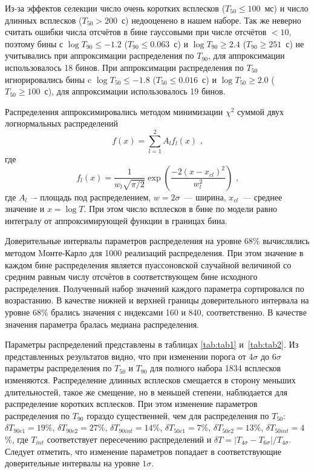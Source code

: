 Из-за эффектов селекции число очень коротких всплесков ($T_{50} \leq 100$~мс) и 
число длинных всплесков ($T_{50} > 200$~с) недооценено в нашем наборе. Так же неверно 
считать ошибки числа отсчётов в бине гауссовыми при числе отсчётов $<10$, поэтому 
бины с $\log T_{90} \leq-1.2$ ($T_{90} \leq 0.063$~с) и $\log T_{90} \geq 2.4$ ($T_{90} \geq 251$~с) 
не учитывались при аппроксимации распределения по $T_{90}$,  для аппроксимации 
использовалось 18 бинов. При аппроксимации распределения по $T_{50}$ игнорировались 
бины c $\log T_{50} \leq -1.8$ ($T_{50} \leq 0.016$~с) и  $\log T_{50} \geq 2.0$ 
($T_{50} \geq 100$~с), для аппроксимации использовалось 19 бинов.

Распределения  аппроксимировались методом минимизации $\chi^2$ суммой двух логнормальных распределений
\begin{equation}
f(x) = \sum_{l=1}^{2} A_l f_l(x) \mbox{ ,}
\end{equation}
где
\begin{equation}
f_l(x) = \frac{1}{w_l \sqrt{\pi/2}} \exp\left(\frac{-2(x-x_{cl})^2}{w_l^2}\right) \mbox{ ,}
\end{equation}
где $A_l$ –- площадь под распределением, $w=2\sigma$~--- ширина, $x_{cl}$~--- среднее значение и 
$x=\log T$. При этом число всплесков в бине по модели равно  интегралу от аппроксимирующей функции в границах бина. 

Доверительные интервалы параметров распределения на уровне 68\% вычислялись 
методом Mонте-Карло для 1000 реализаций распределения. При этом значение в каждом 
бине распределения является пуассоновской случайной величиной со средним равным 
числу отсчётов в соответствующем бине исходного распределения. Полученный набор 
значений каждого параметра сортировался по возрастанию. В качестве нижней и верхней 
границы доверительного интервала на уровне 68\% брались значения с индексами 160 и 840, 
соответственно. В качестве значения параметра бралась медиана распределения.

Параметры распределений представлены в таблицах \ref{tab:tab1} и~\ref{tab:tab2}. 
Из представленных результатов видно, что при изменении порога от 4$\sigma$ до 6$\sigma$ 
параметры распределения по $T_{50}$ и $T_{90}$ для полного набора 1834 всплесков изменяются. 
Распределение длинных всплесков смещается в сторону меньших длительностей, такое же смещение, 
но в меньшей степени, наблюдается для распределение коротких всплесков. 
При этом изменение параметров распределения по $T_{90}$ гораздо существенней, 
чем для распределения по $T_{50}$: 
$\delta T_{90c1} = 19$\%, $\delta T_{90c2} = 27$\%, $\delta T_{90int} = 14$\%, 
$\delta T_{50c1} = 7$\%, $\delta T_{50c2} = 13$\%, $\delta T_{50int} = 4$\%, 
где $T_{int}$ соответствует пересечению распределений и 
$\delta T =|T_{4\sigma}-T_{6\sigma}| / T_{4\sigma}$. 
Следует отметить, что изменение параметров попадает в соответствующие доверительные интервалы на уровне $1\sigma$. 

